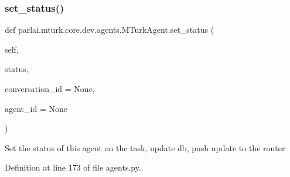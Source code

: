 \mbox{\label{classparlai_1_1mturk_1_1core_1_1dev_1_1agents_1_1MTurkAgent_ade82426c779f110dc1b5f5b309e4a281}} 
\subsubsection{\texorpdfstring{set\+\_\+status()}{set\_status()}}
{\footnotesize\ttfamily def parlai.\+mturk.\+core.\+dev.\+agents.\+M\+Turk\+Agent.\+set\+\_\+status (\begin{DoxyParamCaption}\item[{}]{self,  }\item[{}]{status,  }\item[{}]{conversation\+\_\+id = {\ttfamily None},  }\item[{}]{agent\+\_\+id = {\ttfamily None} }\end{DoxyParamCaption})}

\begin{DoxyVerb}Set the status of this agent on the task, update db, push update
to the router
\end{DoxyVerb}
 

Definition at line 173 of file agents.\+py.



